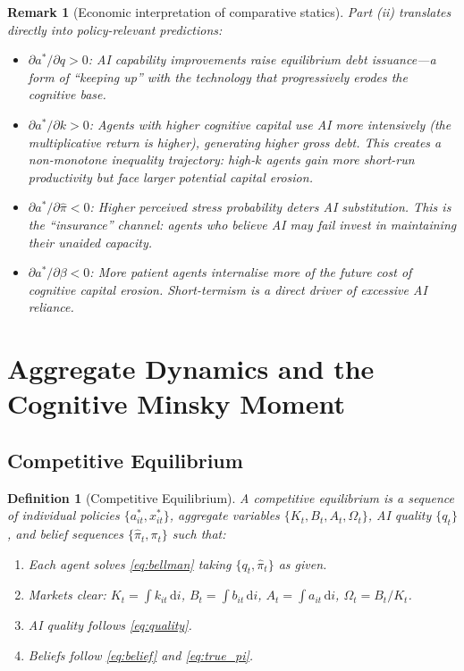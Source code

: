 \documentclass[12pt]{article}
\newtheorem{definition}{Definition}
\newtheorem{remark}{Remark}
\newcommand{\hpi}{\hat{\pi}}
\newcommand{\diff}{\,\mathrm{d}}
\begin{document}
\begin{remark}[Economic interpretation of comparative statics]
Part (ii) translates directly into policy-relevant predictions:
\begin{itemize}
\item $\partial a^*/\partial q > 0$: AI capability improvements raise equilibrium
debt issuance---a form of ``keeping up'' with the technology that progressively
erodes the cognitive base.
\item $\partial a^*/\partial k > 0$: Agents with higher cognitive capital use AI
more intensively (the multiplicative return is higher), generating higher gross debt.
This creates a non-monotone inequality trajectory: high-$k$ agents gain more
short-run productivity but face larger potential capital erosion.
\item $\partial a^*/\partial \hpi < 0$: Higher perceived stress probability deters
AI substitution. This is the ``insurance'' channel: agents who believe AI may fail
invest in maintaining their unaided capacity.
\item $\partial a^*/\partial \beta < 0$: More patient agents internalise more of the
future cost of cognitive capital erosion. Short-termism is a direct driver of
excessive AI reliance.
\end{itemize}
\end{remark}

\section{Aggregate Dynamics and the Cognitive Minsky Moment}
\label{sec:aggregate}

\subsection{Competitive Equilibrium}

\begin{definition}[Competitive Equilibrium]
A competitive equilibrium is a sequence of individual policies $\{a_{it}^*, x_{it}^*\}$,
aggregate variables $\{K_t, B_t, A_t, \Omega_t\}$, AI quality $\{q_t\}$, and belief
sequences $\{\hpi_t, \pi_t\}$ such that:
\begin{enumerate}
\item[\emph{(i)}] Each agent solves \eqref{eq:bellman} taking $\{q_t, \hpi_t\}$
as given.
\item[\emph{(ii)}] Markets clear: $K_t = \int k_{it}\diff i$,
$B_t = \int b_{it}\diff i$, $A_t = \int a_{it}\diff i$,
$\Omega_t = B_t/K_t$.
\item[\emph{(iii)}] AI quality follows \eqref{eq:quality}.
\item[\emph{(iv)}] Beliefs follow \eqref{eq:belief} and \eqref{eq:true_pi}.
\end{enumerate}
\end{definition}
\end{document}
